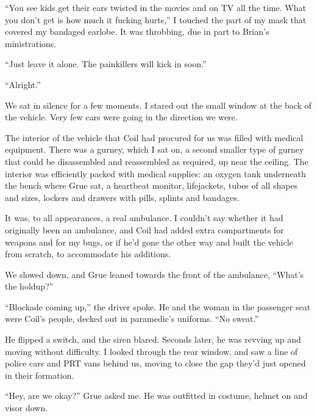 \blacksquare



``You see kids get their ears twisted in the movies and on TV all the time.  What you don't get is how much it fucking hurts,'' I touched the part of my mask that covered my bandaged earlobe.  It was throbbing, due in part to Brian's ministrations.



``Just leave it alone.  The painkillers will kick in soon.''



``Alright.''



We sat in silence for a few moments.  I stared out the small window at the back of the vehicle.  Very few cars were going in the direction we were.



The interior of the vehicle that Coil had procured for us was filled with medical equipment.  There was a gurney, which I sat on, a second smaller type of gurney that could be disassembled and reassembled as required, up near the ceiling.  The interior was efficiently packed with medical supplies: an oxygen tank underneath the bench where Grue sat, a heartbeat monitor, lifejackets, tubes of all shapes and sizes, lockers and drawers with pills, splints and bandages.



It was, to all appearances, a real ambulance.  I couldn't say whether it had originally been an ambulance, and Coil had added extra compartments for weapons and for my bugs, or if he'd gone the other way and built the vehicle from scratch, to accommodate his additions.



We slowed down, and Grue leaned towards the front of the ambulance,  ``What's the holdup?''



``Blockade coming up,'' the driver spoke.  He and the woman in the passenger seat were Coil's people, decked out in paramedic's uniforms.  ``No sweat.''



He flipped a switch, and the siren blared.  Seconds later, he was revving up and moving without difficulty.  I looked through the rear window, and saw a line of police cars and PRT vans behind us, moving to close the gap they'd just opened in their formation.



``Hey, are we okay?'' Grue asked me.  He was outfitted in costume, helmet on and visor down.



